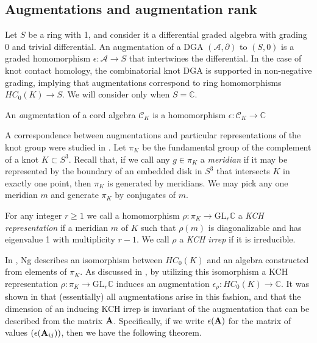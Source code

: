 \documentclass[11pt]{amsart}
\def\C{{\mathbb C}}
\def\A{{\mathcal A}}
\newenvironment{definition}[1][Definition]{\begin{trivlist}
\item[\hskip \labelsep {\bfseries #1}]}{\end{trivlist}}
\begin{document}
\subsection{Augmentations and augmentation rank}
\label{SecBG_AugRk}

  Let $S$ be a ring with 1, and consider it a differential graded algebra with grading 0 and trivial differential. An augmentation of a DGA $(\A,\partial)$ to $(S,0)$ is a graded homomorphism $\epsilon:\A\to S$ that intertwines the differential. In the case of knot contact homology, the combinatorial knot DGA is supported in non-negative grading, implying that augmentations correspond to ring homomorphisms $HC_0(K)\to S$. We will consider only when $S=\C$.

  \begin{definition}
  An {\emph augmentation} of a cord algebra $\mathcal{C}_K$ is a homomorphism $\epsilon\colon \mathcal{C}_K\rightarrow \C$
  \end{definition}

  A correspondence between augmentations and particular representations of the knot group were studied in \cite{Cor13b}. Let $\pi_K$ be the fundamental group of the complement of a knot $K\subset S^3$. Recall that, if we call any $g\in\pi_K$ a \emph{meridian} if it may be represented by the boundary of an embedded disk in $S^3$ that intersects $K$ in exactly one point, then $\pi_K$ is generated by meridians. We may pick any one meridian $m$ and generate $\pi_K$ by conjugates of $m$.

  \begin{definition}
  For any integer $r\ge1$ we call a homomorphism $\rho:\pi_K\to\text{GL}_r\C$ a \emph{KCH representation} if a meridian $m$ of $K$ such that $\rho(m)$ is diagonalizable and has eigenvalue 1 with multiplicity $r-1$. We call $\rho$ a \emph{KCH irrep} if it is irreducible.
  \label{defn:KCHReps}
  \end{definition}

  In \cite{Ng08}, Ng describes an isomorphism between $HC_0(K)$ and an algebra constructed from elements of $\pi_K$. As discussed in \cite{Ng12}, by utilizing this isomorphism a KCH representation $\rho:\pi_K\to\text{GL}_r\C$ induces an augmentation $\epsilon_\rho:HC_0(K)\to\C$. It was shown in \cite{Cor13b} that (essentially) all augmentations arise in this fashion, and that the dimension of an inducing KCH irrep is invariant of the augmentation that can be described from the matrix ${\bf A}$. Specifically, if we write $\epsilon({\bf A})$ for the matrix of values $(\epsilon({\bf A}_{ij}))$, then we have the following theorem.
\end{document}
